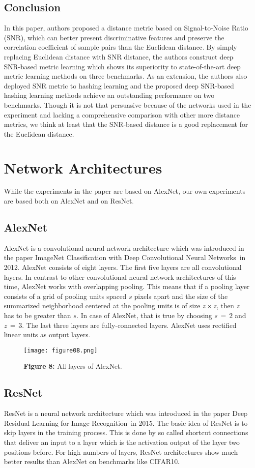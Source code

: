 \documentclass[12pt,paper=a4]{scrartcl}
\theoremstyle{break}
\begin{document}
\subsection{Conclusion}
In this paper, authors proposed a distance metric based on Signal-to-Noise Ratio (SNR), which can better present discriminative features and preserve the correlation coefficient of sample pairs than the Euclidean distance. By simply replacing Euclidean distance with SNR distance, the authors construct deep SNR-based metric learning which shows its superiority to state-of-the-art deep metric learning methods on three benchmarks. As an extension, the authors also deployed SNR metric to hashing learning and the proposed deep SNR-based hashing learning methods achieve an outstanding performance on two benchmarks. Though it is not that persuasive because of the networks used in the experiment and lacking a comprehensive comparison with other more distance metrics, we think at least that the SNR-based distance is a good replacement for the Euclidean distance.
\section{Network Architectures}
While the experiments in the paper are based on AlexNet, our own experiments are based both on AlexNet and on ResNet.
\subsection{AlexNet}
AlexNet is a convolutional neural network architecture which was introduced in the paper \dq ImageNet Classification with Deep Convolutional Neural Networks\dq\, in 2012. AlexNet consists of eight layers. The first five layers are all convolutional layers. In contrast to other convolutional neural network architectures of this time, AlexNet works with overlapping pooling. This means that if a pooling layer consists of a grid of pooling units spaced $s$ pixels apart and the size of the summarized neighborhood centered at the pooling units is of size $z\times z$, then $z$ has to be greater than $s$. In case of AlexNet, that is true by choosing $s\,=\, 2$ and $z\,=\, 3$. The last three layers are fully-connected layers. AlexNet uses rectified linear units as output layers.
\begin{figure}[h]
	\centering
  \texttt{[image: figure08.png]}
  \caption{\textbf{Figure 8:} All layers of AlexNet.}
\end{figure}
\subsection{ResNet}
ResNet is a neural network architecture which was introduced in the paper \dq Deep Residual Learning for Image Recognition\dq\, in 2015. The basic idea of ResNet is to skip layers in the training process. This is done by so called shortcut connections that deliver an input to a layer which is the activation output of the layer two positions before. For high numbers of layers, ResNet architectures show much better results than AlexNet on benchmarks like CIFAR10.
\end{document}
